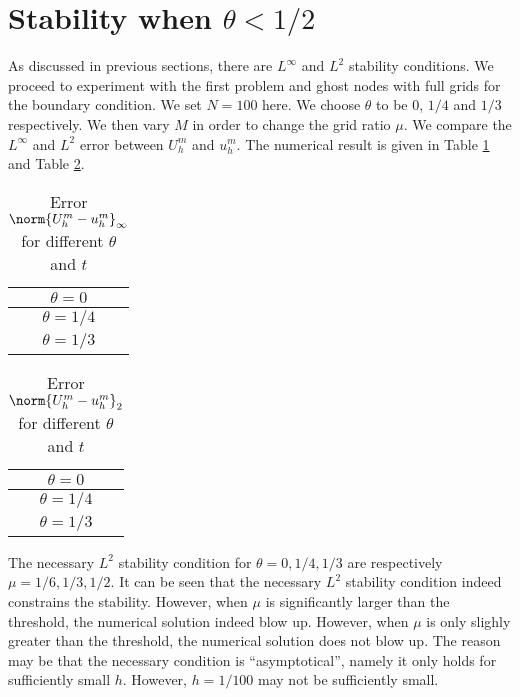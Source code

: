 \documentclass[english, nochinese]{pnote}
\begin{document}
\section{Stability when $ \theta < 1 / 2 $}

As discussed in previous sections, there are $L^{\infty}$ and $L^2$ stability conditions. We proceed to experiment with the first problem and ghost nodes with full grids for the boundary condition. We set $ N = 100 $ here. We choose $\theta$ to be $0$, $ 1 / 4 $ and $ 1 / 3 $ respectively. We then vary $M$ in order to change the grid ratio $\mu$. We compare the $L^{\infty}$ and $L^2$ error between $U_h^m$ and $u_h^m$. The numerical result is given in Table \ref{Tbl:Prob1LI} and Table \ref{Tbl:Prob1L2}.

\begin{table}[htbp]
\centering
\begin{tabular}{|c|c|c|c|c|}
\hline
\multicolumn{5}{|c|}{\texttt{$ \theta = 0 $}} \\
\hline

\multicolumn{5}{|c|}{\texttt{$ \theta = 1 / 4 $}} \\
\hline

\multicolumn{5}{|c|}{\texttt{$ \theta = 1 / 3 $}} \\
\hline

\end{tabular}
\caption{Error $\norm{ U_h^m - u_h^m }_{\infty}$ for different $\theta$ and $t$}
\label{Tbl:Prob1LI}
\end{table}

\begin{table}[htbp]
\centering
\begin{tabular}{|c|c|c|c|c|}
\hline
\multicolumn{5}{|c|}{\texttt{$ \theta = 0 $}} \\
\hline

\multicolumn{5}{|c|}{\texttt{$ \theta = 1 / 4 $}} \\
\hline

\multicolumn{5}{|c|}{\texttt{$ \theta = 1 / 3 $}} \\
\hline

\end{tabular}
\caption{Error $\norm{ U_h^m - u_h^m }_2$ for different $\theta$ and $t$}
\label{Tbl:Prob1L2}
\end{table}

The necessary $L^2$ stability condition for $ \theta = 0, 1 / 4, 1 / 3 $ are respectively $ \mu = 1 / 6, 1 / 3, 1 / 2 $. It can be seen that the necessary $L^2$ stability condition indeed constrains the stability. However, when $\mu$ is significantly larger than the threshold, the numerical solution indeed blow up. However, when $\mu$ is only slighly greater than the threshold, the numerical solution does not blow up. The reason may be that the necessary condition is ``asymptotical'', namely it only holds for sufficiently small $h$. However, $ h = 1 / 100 $ may not be sufficiently small.
\end{document}
